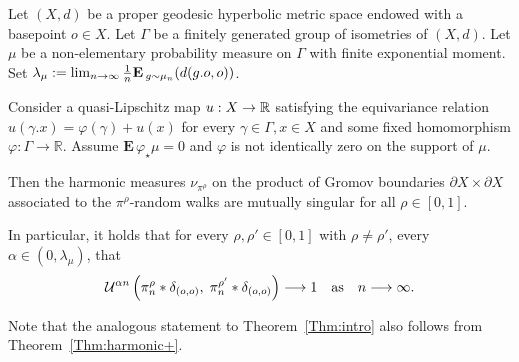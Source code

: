\documentclass[AHL,Unicode,longabstracts,published]{cedram}
\newcommand{\f}{\varphi}
\newcommand{\cU}{\mathcal{U}}
\newcommand{\R}{\mathbb{R}}
\newcommand{\Eb}{\mathbf{E}\,}
\renewcommand{\(}{\left(}
\renewcommand{\)}{\right)}
\renewcommand*{\to}{\mathchoice{\longrightarrow}{\rightarrow}{\rightarrow}{\rightarrow}}
\begin{document}
\begin{theo}\label{Thm:harmonic+}
Let $(X, d)$ be a proper geodesic hyperbolic metric space endowed with a basepoint $o\in X$. Let $\Gamma$ be a finitely generated group of isometries of $(X, d)$. Let $\mu$ be a non-elementary probability measure on $\Gamma$ with finite exponential moment. Set $\lambda_{\mu}:=\lim_{n\to \infty} \frac{1}{n}\Eb_{g \sim \mu_{n}}(d(g.o,o))$.

Consider a quasi-Lipschitz map $u:X \to \R$ satisfying the equivariance relation $u(\gamma.x)=\varphi(\gamma)+u(x)$ for every $\gamma\in \Gamma, x\in X$ and some fixed homomorphism $\f:\Gamma\rightarrow \R$. Assume $\Eb \f_\star\mu=0$ and $\f$ is not identically zero on the support of $\mu$.


Then the harmonic measures $\nu_{\pi^\rho}$ on the product of Gromov boundaries $\partial X\times \partial X$ associated to the $\pi^\rho$-random walks are mutually singular for all $\rho \in [0, 1]$.

In particular, it holds that for every $\rho, \rho' \in [0, 1]$ with $\rho \neq \rho'$, every $\alpha\in (0, \lambda_{\mu})$, that
\[
\cU^{\alpha n}\left(\pi^\rho_{n}*\delta_{(o,o)}, \;\pi^{\rho'}_{n}*\delta_{(o,o)}\right)
\to 1 \quad \text{as}\quad n \to \infty.
\]
\end{theo}


Note that the analogous statement to Theorem~\ref{Thm:intro} also follows from Theorem~\ref{Thm:harmonic+}.




\end{document}
